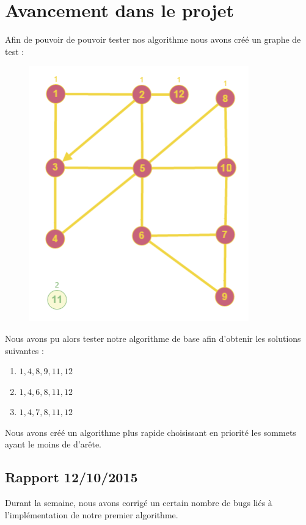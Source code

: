 \documentclass[10pt,a4paper]{article}
\begin{document}
\section{Avancement dans le projet}

Afin de pouvoir de pouvoir tester nos algorithme nous avons créé un graphe de test :

\begin{figure}[h]
 \hspace{-4cm}
\includegraphics[scale=1]{exemplegraphe.png}
\end{figure} 

Nous avons pu alors tester notre algorithme de base afin d'obtenir les solutions suivantes :

\begin{enumerate}
\item ${1, 4, 8, 9, 11, 12}$
\item ${1, 4, 6, 8, 11, 12 }$
\item ${1, 4, 7, 8, 11, 12 }$
\end{enumerate}

Nous avons créé un algorithme plus rapide choisissant en priorité les sommets ayant le moins de d'arête.

\subsection{Rapport 12/10/2015}

Durant la semaine, nous avons corrigé un certain nombre de bugs liés à l'implémentation de notre premier algorithme.
\end{document}
